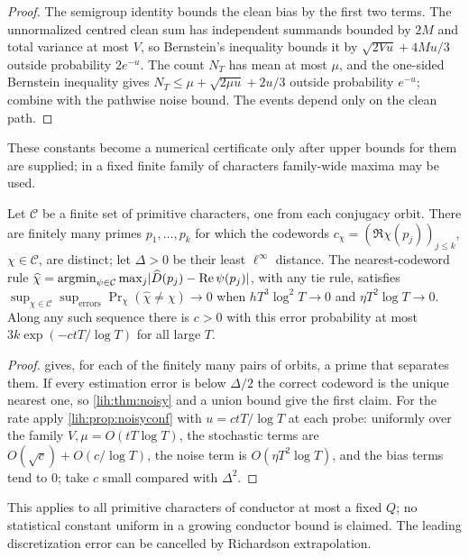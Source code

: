 \begin{proof}
The semigroup identity bounds the clean bias by the first two terms. The unnormalized centred clean
sum has independent summands bounded by $2M$ and total variance at most $V$, so Bernstein's inequality
bounds it by $\sqrt{2Vu}+4Mu/3$ outside probability $2e^{-u}$. The count $N_T$ has mean at most $\mu$, and the
one-sided Bernstein inequality gives $N_T\le\mu+\sqrt{2\mu u}+2u/3$ outside probability $e^{-u}$; combine with the
pathwise noise bound. The events depend only on the clean path.
\end{proof}

These constants become a numerical certificate only after upper bounds for them are supplied; in a
fixed finite family of characters family-wide maxima may be used.

\begin{theorem}\label{lih:thm:noisyfamily}
Let $\mathcal C$ be a finite set of primitive characters, one from each conjugacy orbit. There are finitely
many primes $p_1,\dots,p_k$ for which the codewords $c_\chi=(\Re\chi(p_j))_{j\le k}$, $\chi\in\mathcal C$, are distinct; let
$\Delta>0$ be their least $\ell^\infty$ distance. The nearest-codeword rule
$\widehat\chi=\operatorname{argmin}_{\psi\in\mathcal C}\max_j\lvert\widehat D(p_j)-\operatorname{Re}\psi(p_j)\rvert$, with any tie rule, satisfies
$\sup_{\chi\in\mathcal C}\sup_{\text{errors}}\Pr_\chi(\widehat\chi\ne\chi)\to0$ when $hT^3\log^2T\to0$ and $\eta T^2\log T\to0$. Along any such
sequence there is $c>0$ with this error probability at most $3k\exp(-ctT/\log T)$ for all large $T$.
\end{theorem}

\begin{proof}
 gives, for each of the finitely many pairs of orbits, a prime that separates them. If
every estimation error is below $\Delta/2$ the correct codeword is the unique nearest one, so
\cref{lih:thm:noisy} and a union bound give the first claim. For the rate apply
\cref{lih:prop:noisyconf} with $u=ctT/\log T$ at each probe: uniformly over the family $V,\mu=O(tT\log T)$, the
stochastic terms are $O(\sqrt c)+O(c/\log T)$, the noise term is $O(\eta T^2\log T)$, and the bias terms tend to $0$;
take $c$ small compared with $\Delta^2$.
\end{proof}

This applies to all primitive characters of conductor at most a fixed $Q$; no statistical constant
uniform in a growing conductor bound is claimed. The leading discretization error can be cancelled by
Richardson extrapolation.

